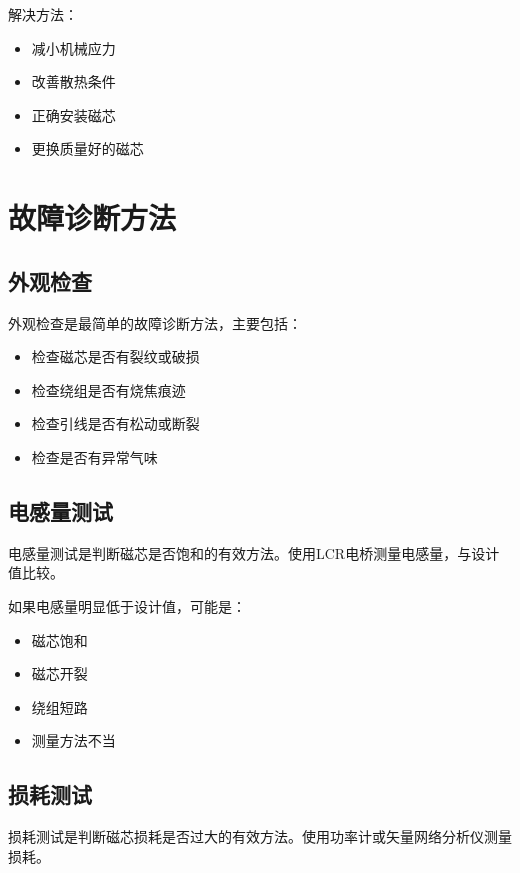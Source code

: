 \documentclass[12pt,UTF8]{ctexbook}
\begin{document}
解决方法：

\begin{itemize}[leftmargin=2cm]
    \item 减小机械应力
    \item 改善散热条件
    \item 正确安装磁芯
    \item 更换质量好的磁芯
\end{itemize}

\section{故障诊断方法}

\subsection{外观检查}

外观检查是最简单的故障诊断方法，主要包括：

\begin{itemize}[leftmargin=2cm]
    \item 检查磁芯是否有裂纹或破损
    \item 检查绕组是否有烧焦痕迹
    \item 检查引线是否有松动或断裂
    \item 检查是否有异常气味
\end{itemize}

\subsection{电感量测试}

电感量测试是判断磁芯是否饱和的有效方法。使用LCR电桥测量电感量，与设计值比较。

如果电感量明显低于设计值，可能是：

\begin{itemize}[leftmargin=2cm]
    \item 磁芯饱和
    \item 磁芯开裂
    \item 绕组短路
    \item 测量方法不当
\end{itemize}

\subsection{损耗测试}

损耗测试是判断磁芯损耗是否过大的有效方法。使用功率计或矢量网络分析仪测量损耗。
\end{document}
